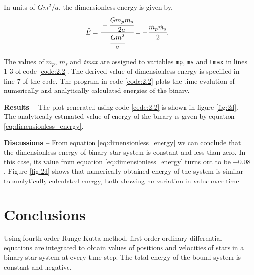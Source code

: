\documentclass[a4paper]{article}
\begin{document}
\begin{enumerate} [label*=\textbf{(\alph*)}]
				In units of \(Gm^2/a\), the dimensionless energy is given by,
				\begin{equation}
					\tilde{E} = \cfrac{-\cfrac{G m_p m_s}{2a}}{\cfrac{G m^2}{a}} = -\cfrac{\tilde{m}_p \tilde{m}_s}{2}.
					\label{eq:dimensionless_energy}
				\end{equation}
				
				\begin{figure}
					
				\end{figure}
				
				The values of \(m_p\), \(m_s\) and \emph{tmax} are assigned to variables \texttt{mp}, \texttt{ms} and \texttt{tmax} in lines 1-3 of code \ref{code:2.2}. The derived value of dimensionless energy is specified in line 7 of the code. The program in code \ref{code:2.2} plots the time evolution of numerically and analytically calculated energies of the binary.
				
				\subitem \textbf{Results  --}
				The plot generated using code \ref{code:2.2} is shown in figure \ref{fig:2d}. The analytically estimated value of energy of the binary is given by equation \ref{eq:dimensionless_energy}.
				
				\subitem \textbf{Discussions  --}
				From equation \ref{eq:dimensionless_energy} we can conclude that the dimensionless energy of binary star system is constant and less than zero. In this case, its value from equation \ref{eq:dimensionless_energy} turns out to be \(-0.08\). Figure \ref{fig:2d} shows that numerically obtained energy of the system is similar to analytically calculated energy, both showing no variation in value over time.
			
		\end{enumerate}



		\section{Conclusions} \label{2:conclusions}
		Using fourth order Runge-Kutta method, first order ordinary differential equations are integrated to obtain values of positions and velocities of stars in a binary star system at every time step. The total energy of the bound system is constant and negative. 
\end{document}
